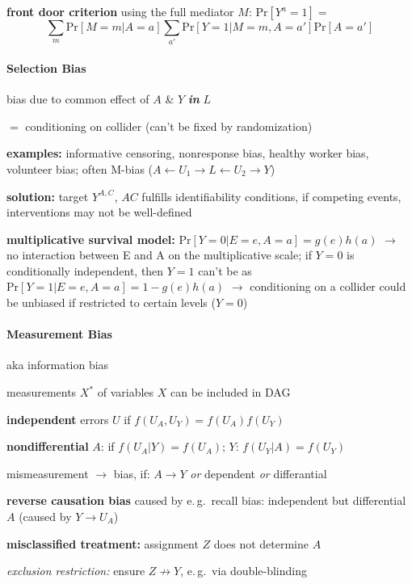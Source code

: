 \documentclass[8pt,twoside]{extarticle}
\begin{document}
\begin{multicols}{2}
 \textbf{front door criterion} using the full mediator $M$: $\mathrm{Pr}\left[Y^a=1\right]=$
$$\sum_m \mathrm{Pr}\left[M=m|A=a\right] \sum_{a'} \mathrm{Pr}\left[Y=1|M=m, A=a'\right]\mathrm{Pr}\left[A=a'\right]$$


\paragraph{Selection Bias} bias due to common effect of $A$ \& $Y$ \textbf{\textit{in}} $L$

  $=$ conditioning on collider (can't be fixed by randomization)


 \textbf{examples:} informative censoring, nonresponse bias, healthy worker bias, volunteer bias; often M-bias ($A {\leftarrow} U_1 {\to} L {\leftarrow} U_2 {\to} Y$)


 \textbf{solution:} target $Y^{A, C}$, $AC$ fulfills identifiability conditions, \newline
 if competing events, interventions may not be well-defined


 \textbf{multiplicative survival model:} $\mathrm{Pr}\left[Y{=}0|E{=}e, A{=}a\right]{=}g(e)h(a)$
$\rightarrow$ no interaction between E and A on the multiplicative scale; \newline
if $Y=0$ is conditionally independent, then $Y=1$ can't be as $\mathrm{Pr}\left[Y{=}1|E{=}e, A{=}a\right]{=}1-g(e)h(a)$
$\rightarrow$ conditioning on a collider could be unbiased if restricted to certain levels ($Y=0$)


\paragraph{Measurement Bias} aka information bias 

 measurements $X^*$ of variables $X$ can be included in DAG

 \textbf{independent} errors $U$ if $f(U_A, U_Y) = f(U_A)f(U_Y)$

 \textbf{nondifferential} $A$:  if $f(U_A|Y)=f(U_A)$; $Y$: $f(U_Y|A)=f(U_Y)$

 mismeasurement $\to$ bias, if: $A\to Y$ \textit{or} dependent \textit{or} differantial

 \textbf{reverse causation bias} caused by e.\,g.\ recall bias: independent but differential $A$ (caused by $Y \to U_A$)


 \textbf{misclassified treatment:} assignment $Z$ does not determine $A$

 \textit{exclusion restriction:} ensure  $Z\not\to Y$, e.\,g.\ via double-blinding




\end{multicols}
\end{document}
